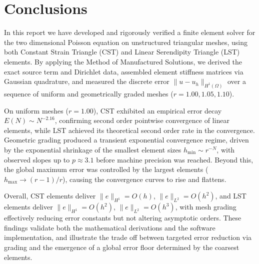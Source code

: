 \section{Conclusions}

In this report we have developed and rigorously verified a finite element solver for the two dimensional Poisson equation on unstructured triangular meshes, using both Constant Strain Triangle (CST) and Linear Serendipity Triangle (LST) elements. By applying the Method of Manufactured Solutions, we derived the exact source term and Dirichlet data, assembled element stiffness matrices via Gaussian quadrature, and measured the discrete error $\|u - u_h\|_{H^1(\Omega)}$ over a sequence of uniform and geometrically graded meshes ($r=1.00,1.05,1.10$).

On uniform meshes ($r=1.00$), CST exhibited an empirical error decay $E(N)\sim N^{-2.16}$, confirming second order pointwise convergence of linear elements, while LST achieved its theoretical second order rate in the convergence. Geometric grading produced a transient exponential convergence regime, driven by the exponential shrinkage of the smallest element sizes $h_{\min}\sim r^{-N}$, with observed slopes up to $p\approx3.1$ before machine precision was reached. Beyond this, the global maximum error was controlled by the largest elements ($h_{\max}\to(r-1)/r$), causing the convergence curves to rise and flattens.

Overall, CST elements deliver $\|e\|_{H^1}=O(h)$, $\|e\|_{L^2}=O(h^2)$, and LST elements deliver $\|e\|_{H^1}=O(h^2)$, $\|e\|_{L^2}=O(h^3)$, with mesh grading effectively reducing error constants but not altering asymptotic orders. These findings validate both the mathematical derivations and the software implementation, and illustrate the trade off between targeted error reduction via grading and the emergence of a global error floor determined by the coarsest elements.

